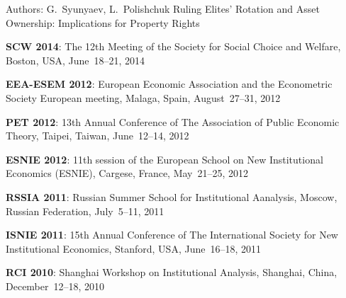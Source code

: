 

\begin{cventries}

  \cventry
    {Authors: G.~Syunyaev, L.~Polishchuk} %
    {Ruling Elites' Rotation and Asset Ownership: Implications for Property Rights} %
    {} %
    {} %
    {
      \begin{cvitems} %
        \item {\textbf{SCW 2014}: The 12th Meeting of the Society for Social Choice and Welfare, Boston, USA, June~18--21, 2014}
        \item {\textbf{EEA-ESEM 2012}: European Economic Association and the Econometric Society European meeting, Malaga, Spain, August~27--31, 2012}
        \item {\textbf{PET 2012}: 13th Annual Conference of The Association of Public Economic Theory, Taipei, Taiwan, June~12--14, 2012}
        \item {\textbf{ESNIE 2012}: 11th session of the European School on New Institutional Economics (ESNIE), Cargese, France, May~21--25, 2012}
        \item {\textbf{RSSIA 2011}: Russian Summer School for Institutional Aanalysis, Moscow, Russian Federation, July~5--11, 2011}
        \item {\textbf{ISNIE 2011}: 15th Annual Conference of The International Society for New Institutional Economics, Stanford, USA, June~16--18, 2011}
        \item {\textbf{RCI 2010}: Shanghai Workshop on Institutional Analysis, Shanghai, China, December~12--18, 2010}
      \end{cvitems}
    }


\end{cventries}
